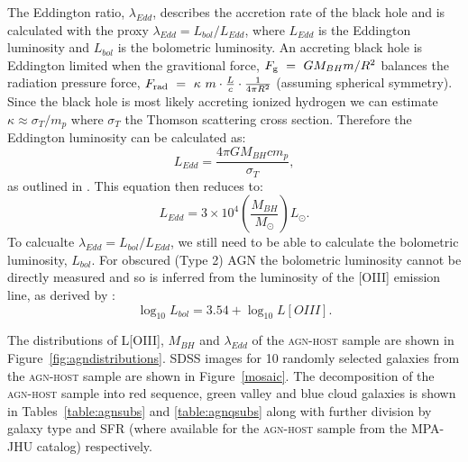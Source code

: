 The Eddington ratio, $\lambda_{Edd}$, describes the accretion rate of the black hole and is calculated with the proxy $\lambda_{Edd} = L_{bol}/L_{Edd}$, where $L_{Edd}$ is the Eddington luminosity and $L_{bol}$ is the bolometric luminosity. An accreting black hole is Eddington limited when the gravitional force, $F_{\rm{g}}~=~GM_{BH}m/R^2$ balances the radiation pressure force, $F_{\rm{rad}}~=~\kappa~m\cdot\frac{L}{c}\cdot\frac{1}{4\pi R^2}$ (assuming spherical symmetry). Since the black hole is most likely accreting ionized hydrogen we can estimate $\kappa\approx \sigma_T/m_p$ where $\sigma_T$ the Thomson scattering cross section. Therefore the Eddington luminosity can be calculated as:
\begin{equation}
L_{Edd} = \frac{4\pi G M_{BH} c m_p}{\sigma_T},
\end{equation}
as outlined in \citet{binneymerrifield}. This equation then reduces to:
\begin{equation}
L_{Edd} = 3\times10^4 \left(\frac{M_{BH}}{M_{\odot}}\right) L_{\odot}.
\end{equation}
To calcualte $\lambda_{Edd} = L_{bol}/L_{Edd}$, we still need to be able to calculate the bolometric luminosity, $L_{bol}$. For obscured (Type 2) AGN the bolometric luminosity cannot be directly measured and so is inferred from the luminosity of the [OIII] emission line, as derived by \citet{heckman04}:
\begin{equation}
\log_{10}L_{bol} = 3.54 + \log_{10}L[OIII]. 
\end{equation}

The distributions of L[OIII], $M_{BH}$ and $\lambda_{Edd}$ of the \textsc{agn-host} sample are shown in Figure~\ref{fig:agndistributions}. SDSS images for 10 randomly selected galaxies from the \textsc{agn-host} sample are shown in Figure~\ref{mosaic}. The decomposition of the \textsc{agn-host} sample into red sequence, green valley and blue cloud galaxies is shown in Tables~\ref{table:agnsubs} and \ref{table:agnqsubs} along with further division by galaxy type and SFR (where available for the \textsc{agn-host} sample from the MPA-JHU catalog) respectively. 


